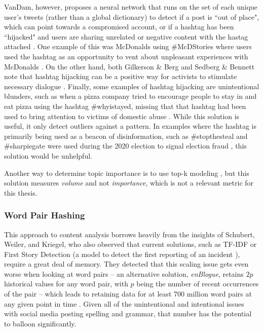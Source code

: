 \documentclass[preprint,review,12pt]{elsarticle}
\begin{document}
VanDam, however, proposes a neural network that runs on the set of each unique user's tweets (rather than a global dictionary) to detect if a post is ``out of place", which can point towards a compromised account, or if a hashtag has been ``hijacked" and users are sharing unrelated or negative content with the hastag attached  \cite{vandam2019learning, vandam2016detecting}. One example of this was McDonalds using \#McDStories where users used the hashtag as an opportunity to vent about unpleasant experiences with McDonalds \cite{jain2015hashjacker}. On the other hand, both Gilkerson & Berg and Sedberg & Bennett note that hashtag hijacking can be a positive way for activists to stimulate necessary dialogue \cite{gilkerson2018social,bennett2012logic}. Finally, some examples of hashtag hijacking are unintentional blunders, such as when a pizza company tried to encourage people to stay in and eat pizza using the hashtag \#whyistayed, missing that that hashtag had been used to bring attention to victims of domestic abuse \cite{vandam2019learning}. While this solution is useful, it only detect outliers against a pattern. In examples where the hashtag is primarily being used as a beacon of disinformation, such as \#stopthesteal and \#sharpiegate were used during the 2020 election to signal election fraud \cite{perez2020facebook}, this solution would be unhelpful.

Another way to determine topic importance is to use top-k modeling \cite{babcock2003distributed}, but this solution measures \textit{volume} and not \textit{importance}, which is not a relevant metric for this thesis. 

\subsubsection{Word Pair Hashing}
This approach to content analysis borrows heavily from the insights of Schubert, Weiler, and Kriegel, who also observed that current solutions, such as TF-IDF or First Story Detection (a model to detect the first reporting of an incident \cite{petrovic2010streaming,yang1998study}), require a great deal of memory. They detected that this scaling issue gets even worse when looking at word pairs -- an alternative solution, \textit{enBlogue}, retains $2p$ historical values for any word pair, with $p$ being the number of recent occurrences of the pair \cite{alvanaki2012see} -- which leads to retaining data for at least 700 million word pairs at any given point in time \cite{schubert2014signitrend}. Given all of the unintentional and intentional issues with social media posting spelling and grammar, that number has the potential to balloon significantly. 
\end{document}
